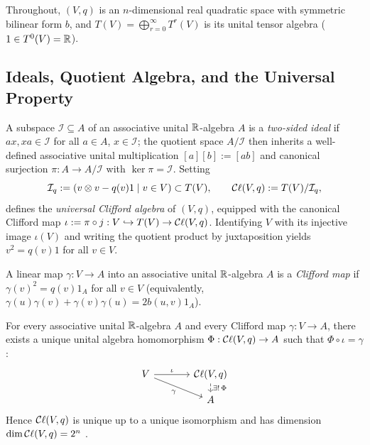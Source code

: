 \documentclass[11pt,a4paper]{article}
\begin{document}
Throughout, $(V, q)$ is an $n$-dimensional real quadratic space with symmetric
bilinear form $b$, and $T(V) = \bigoplus_{r=0}^{\infty} T^r(V)$ is its unital
tensor algebra ($1 \in T^0(V) = \mathbb{R}$).

\subsection{Ideals, Quotient Algebra, and the Universal Property}
\label{subsec:quotient-universal}

\begin{definition}
  \label{def:clifford-algebra}
  A subspace $\mathcal{I} \subseteq A$ of an associative unital $\mathbb{R}$-algebra
  $A$ is a \emph{two-sided ideal} if $ax, xa \in \mathcal{I}$ for all
  $a \in A$, $x \in \mathcal{I}$; the quotient space $A/\mathcal{I}$
  \cite[Sec.~3.E]{axlerLinearAlgebraDone2015} then
  inherits a well-defined associative unital multiplication $[a][b] := [ab]$
  and canonical surjection $\pi : A \to A/\mathcal{I}$ with $\ker\pi =
  \mathcal{I}$.
  Setting
  \begin{equation}
    \label{eq:clifford-ideal}
    \mathcal{I}_q := \left( v \otimes v - q(v) 1 \;\middle|\; v \in V
    \right) \subset T(V), \qquad
    \mathcal{C}\ell(V, q) := T(V) / \mathcal{I}_q,
  \end{equation}
  defines the \emph{universal Clifford algebra} of $(V, q)$, equipped with the
  canonical Clifford map $\iota := \pi \circ j : V \hookrightarrow T(V) \to
  \mathcal{C}\ell(V, q)$.
  Identifying $V$ with its injective image $\iota(V)$ and writing the quotient
  product by juxtaposition yields $v^2 = q(v) 1$ for all $v \in V$.
\end{definition}

A linear map $\gamma : V \to A$ into an associative unital $\mathbb{R}$-algebra $A$ is
a \emph{Clifford map} if $\gamma(v)^2 = q(v)1_A$ for all $v \in V$
(equivalently, $\gamma(u)\gamma(v) + \gamma(v)\gamma(u) = 2b(u, v)1_A$).

\begin{theorem}
  \label{thm:universal-property}
  For every associative unital $\mathbb{R}$-algebra $A$ and every Clifford map
  $\gamma : V \to A$, there exists a unique unital algebra homomorphism
  $\Phi : \mathcal{C}\ell(V, q) \to A$ such that $\Phi \circ \iota = \gamma$:
  \begin{equation}
    \label{eq:universal-diagram}
    \begin{tikzcd}[column sep=large, row sep=small]
      V \arrow[r, "\iota"] \arrow[dr, "\gamma"'] & \Cl(V, q) \arrow[d,
        dashed, "\exists!\,\Phi"] \\
      & A
    \end{tikzcd}
  \end{equation}
  Hence $\mathcal{C}\ell(V, q)$ is unique up to a unique isomorphism and has dimension
  $\dim \mathcal{C}\ell(V, q) = 2^n$
  \cite[Secs.~3.1--3.2]{vazIntroductionCliffordAlgebras2016}.
\end{theorem}
\end{document}

